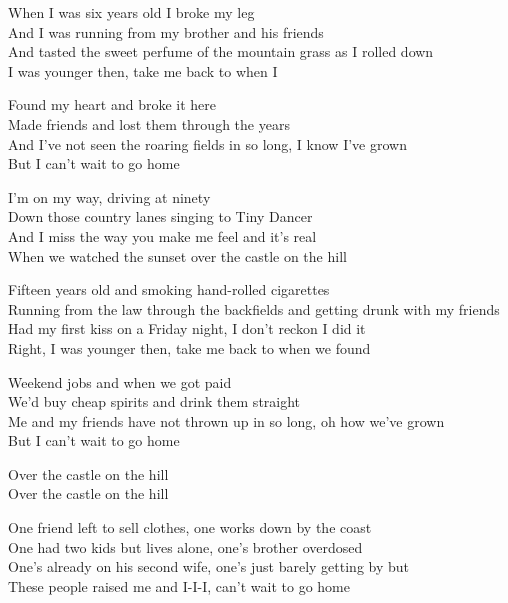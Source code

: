 
\ve{}
When I was six years old I broke my leg \\
And I was running from my brother and his friends \\
And tasted the sweet perfume of the mountain grass as I rolled down\\
I was younger then, take me back to when I

\re{}
Found my heart and broke it here\\
Made friends and lost them through the years\\
And I've not seen the roaring fields in so long, I know I've grown\\
But I can't wait to go home

\cho{}
I'm on my way, driving at ninety\\
Down those country lanes singing to Tiny Dancer\\
And I miss the way you make me feel and it's real\\
When we watched the sunset over the castle on the hill

\ve{}
Fifteen years old and smoking hand-rolled cigarettes\\
Running from the law through the backfields and getting drunk with my friends\\
Had my first kiss on a Friday night, I don't reckon I did it\\
Right, I was younger then, take me back to when we found

\re{}
Weekend jobs and when we got paid\\
We'd buy cheap spirits and drink them straight\\
Me and my friends have not thrown up in so long, oh how we've grown\\
But I can't wait to go home

\cho{}
\re{}
 \quad {}Over the castle on the hill\\
 \quad {}Over the castle on the hill

\ve{}
One friend left to sell clothes, one works down by the coast\\
One had two kids but lives alone, one's brother overdosed\\
One's already on his second wife, one's just barely getting by but\\
These people raised me and I-I-I, can't wait to go home

